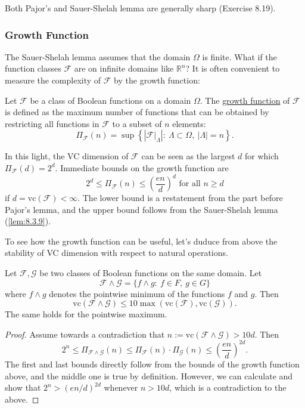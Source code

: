 Both Pajor's and Sauer-Shelah lemma are generally sharp (Exercise 8.19).


\subsubsection{Growth Function}
The Sauer-Shelah lemma assumes that the domain $\Omega$ is finite. What if the function classes $\mathcal{F}$ 
are on infinite domains like $\mathbb{R}^n$? It is often convenient to measure the complexity of $\mathcal{F}$ 
by the growth function:

\begin{definition}[]
\label{def:8.3.10}
Let $\mathcal{F}$ be a class of Boolean functions on a domain $\Omega$. The \underline{growth function} of 
$\mathcal{F}$ is defined as the maximum number of functions that can be obtained by restricting all functions in 
$\mathcal{F}$ to a subset of $n$ elements: 
\[ \Pi_{\mathcal{F}}(n) = \sup_{} \left\{ \left| \mathcal{F}|_{\Lambda} \right| : \ \Lambda \subset \Omega, 
\ |\Lambda| = n \right\}. \]
\end{definition}

In this light, the VC dimension of $\mathcal{F}$ can be seen as the largest $d$ for which $\Pi_{\mathcal{F}}(d) 
= 2^d$. Immediate bounds on the growth function are 
\[ 2^d \leq \Pi_{\mathcal{F}}(n) \leq \left( \frac{en}{d} \right)^d \text{ for all } n \geq d \]
if $d = \mathrm{vc}(\mathcal{F}) < \infty$. The lower bound is a restatement from the part before Pajor's lemma, 
and the upper bound follows from the Sauer-Shelah lemma (\cref{lem:8.3.9}).

To see how the growth function can be useful, let's duduce from above the stability of VC dimension with 
respect to natural operations.

\begin{proposition}[VC stability]
\label{prop:8.3.11}
Let $\mathcal{F}, \mathcal{G}$ be two classes of Boolean functions on the same domain. Let 
\[ \mathcal{F} \wedge \mathcal{G} = \{ f \wedge g: \ f \in F, \ g \in G \} \]
where $f \wedge g$ denotes the pointwise minimum of the functions $f$ and $g$. Then 
\[ \mathrm{vc}(\mathcal{F} \wedge \mathcal{G}) \leq 10 \max_{}(\mathrm{vc}(\mathcal{F}), 
\mathrm{vc}(\mathcal{G})). \]
The same holds for the pointwise maximum.
\end{proposition}

\begin{proof}
Assume towards a contradiction that $n := \mathrm{vc}(\mathcal{F} \wedge \mathcal{G}) > 10d$. Then 
\[ 2^n \leq \Pi_{\mathcal{F} \wedge \mathcal{G}}(n) \leq \Pi_{\mathcal{F}}(n) \cdot \Pi_{\mathcal{G}}(n) 
\leq \left( \frac{en}{d} \right)^{2d}. \]
The first and last bounds directly follow from the bounds of the growth function above, and the middle one is 
true by definition. However, we can calculate and show that $2^n > (en / d)^{2d}$ whenever $n > 10d$, which 
is a contradiction to the above.
\end{proof}

